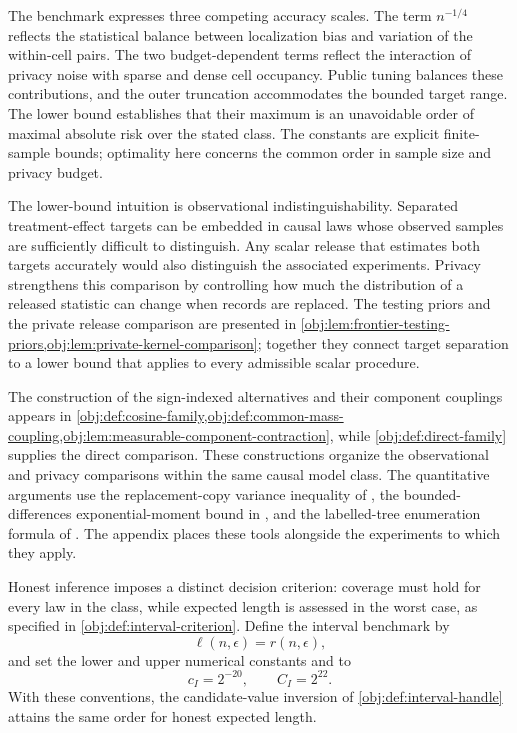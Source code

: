 The benchmark expresses three competing accuracy scales. The term \(n^{-1/4}\) reflects the statistical balance between localization bias and variation of the within-cell pairs. The two budget-dependent terms reflect the interaction of privacy noise with sparse and dense cell occupancy. Public tuning balances these contributions, and the outer truncation accommodates the bounded target range. The lower bound establishes that their maximum is an unavoidable order of maximal absolute risk over the stated class. The constants are explicit finite-sample bounds; optimality here concerns the common order in sample size and privacy budget.

The lower-bound intuition is observational indistinguishability. Separated treatment-effect targets can be embedded in causal laws whose observed samples are sufficiently difficult to distinguish. Any scalar release that estimates both targets accurately would also distinguish the associated experiments. Privacy strengthens this comparison by controlling how much the distribution of a released statistic can change when records are replaced. The testing priors and the private release comparison are presented in \cref{obj:lem:frontier-testing-priors,obj:lem:private-kernel-comparison}; together they connect target separation to a lower bound that applies to every admissible scalar procedure.

The construction of the sign-indexed alternatives and their component couplings appears in \cref{obj:def:cosine-family,obj:def:common-mass-coupling,obj:lem:measurable-component-contraction}, while \cref{obj:def:direct-family} supplies the direct comparison. These constructions organize the observational and privacy comparisons within the same causal model class. The quantitative arguments use the replacement-copy variance inequality of \citet[Theorem 3.1, p.~54]{BoucheronLugosiMassart2013}, the bounded-differences exponential-moment bound in \citet[Theorem 6.2, displayed log-mgf conclusion in the proof, p.~167]{BoucheronLugosiMassart2013}, and the labelled-tree enumeration formula of \citet[Section 5.6, Theorem 5.40]{KellerTrotterAppliedCombinatorics}. The appendix places these tools alongside the experiments to which they apply.

Honest inference imposes a distinct decision criterion: coverage must hold for every law in the class, while expected length is assessed in the worst case, as specified in \cref{obj:def:interval-criterion}. Define the interval benchmark  by
\[
\ell(n,\epsilon)=r(n,\epsilon),
\]
and set the lower and upper numerical constants  and  to
\[
c_I=2^{-20},
\qquad
C_I=2^{22}.
\]
With these conventions, the candidate-value inversion of \cref{obj:def:interval-handle} attains the same order for honest expected length.

